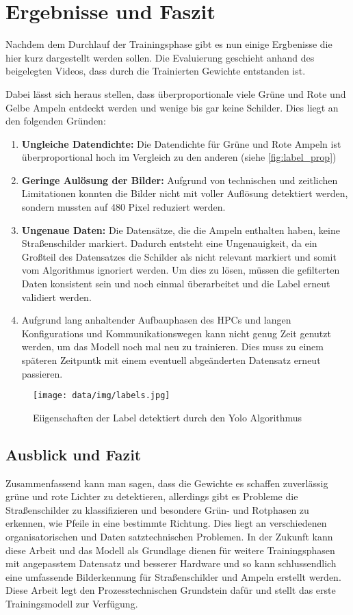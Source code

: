 \chapter{Ergebnisse und Faszit}
Nachdem dem Durchlauf der Trainingsphase gibt es nun einige Ergbenisse die hier kurz dargestellt werden sollen. Die Evaluierung geschieht anhand des beigelegten Videos, dass durch die Trainierten Gewichte entstanden ist.

Dabei lässt sich heraus stellen, dass überproportionale viele Grüne und Rote und Gelbe Ampeln entdeckt werden und wenige bis gar keine Schilder. Dies liegt an den folgenden Gründen:
 
\begin{enumerate}
    \item \textbf{Ungleiche Datendichte:} Die Datendichte für Grüne und Rote Ampeln ist überproportional hoch im Vergleich zu den anderen (siehe \autoref{fig:label_prop})
    \item \textbf{Geringe Aulösung der Bilder:} Aufgrund von technischen und zeitlichen Limitationen konnten die Bilder nicht mit voller Auflösung detektiert werden, sondern mussten auf 480 Pixel reduziert werden.
    \item \textbf{Ungenaue Daten:} Die Datensätze, die die Ampeln enthalten haben, keine Straßenschilder markiert. Dadurch entsteht eine Ungenauigkeit, da ein Großteil des Datensatzes die Schilder als nicht relevant markiert und somit vom Algorithmus ignoriert werden. Um dies zu lösen, müssen die gefilterten Daten konsistent sein und noch einmal überarbeitet und die Label erneut validiert werden.
    \item Aufgrund lang anhaltender Aufbauphasen des HPCs und langen Konfigurations und Kommunikationswegen kann nicht genug Zeit genutzt werden, um das Modell noch mal neu zu trainieren. Dies muss zu einem späteren Zeitpuntk mit einem eventuell abgeänderten Datensatz erneut passieren.
\end{enumerate}

\begin{figure}
    \texttt{[image: data/img/labels.jpg]}
    \caption{Eiigenschaften der Label detektiert durch den Yolo Algorithmus}
    \label{fig:label_prop}
\end{figure}

\section{Ausblick und Fazit}

Zusammenfassend kann man sagen, dass die Gewichte es schaffen zuverlässig grüne und rote Lichter zu detektieren, allerdings gibt es Probleme die Straßenschilder zu klassifizieren und besondere Grün- und Rotphasen zu erkennen, wie Pfeile in eine bestimmte Richtung. Dies liegt an verschiedenen organisatorischen und Daten satztechnischen Problemen. In der Zukunft kann diese Arbeit und das Modell als Grundlage dienen für weitere Trainingsphasen mit angepasstem Datensatz und besserer Hardware und so kann schlussendlich eine umfassende Bilderkennung für Straßenschilder und Ampeln erstellt werden. Diese Arbeit legt den Prozesstechnischen Grundstein dafür und stellt das erste Trainingsmodell zur Verfügung.